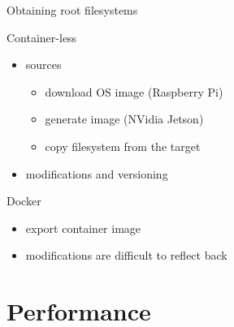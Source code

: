 \documentclass[hyperref={colorlinks=false, breaklinks=true},11pt]{beamer}
\begin{document}
\begin{frame}{Obtaining root filesystems}
    \begin{block}{Container-less}
        \begin{itemize}
            \item sources
                \begin{itemize}
                    \item download OS image (Raspberry Pi)
                    \item generate image (NVidia Jetson)
                    \item copy filesystem from the target
                \end{itemize}
            \item modifications and versioning
        \end{itemize}
    \end{block}

    \begin{block}{Docker}
        \begin{itemize}
            \item export container image
            \item modifications are difficult to reflect back
        \end{itemize}
    \end{block}
\end{frame}


\section{Performance}
\end{document}
